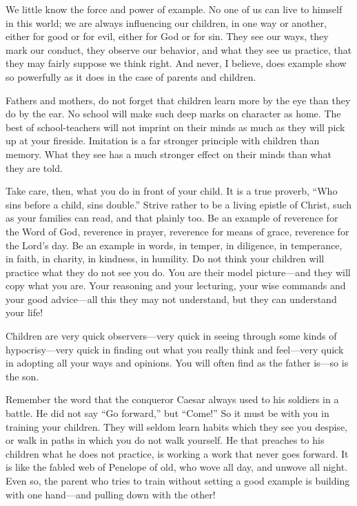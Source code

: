 \documentclass[
]{book}
\begin{document}
We little know the force and power of example. No one of us can live to himself in this world; we are always influencing our children, in one way or another, either for good or for evil, either for God or for sin. They see our ways, they mark our conduct, they observe our behavior, and what they see us practice, that they may fairly suppose we think right. And never, I believe, does example show so powerfully as it does in the case of parents and children.

Fathers and mothers, do not forget that children learn more by the eye than they do by the ear. No school will make such deep marks on character as home. The best of school-teachers will not imprint on their minds as much as they will pick up at your fireside. Imitation is a far stronger principle with children than memory. What they see has a much stronger effect on their minds than what they are told.

Take care, then, what you do in front of your child. It is a true proverb, ``Who sins before a child, sins double.'' Strive rather to be a living epistle of Christ, such as your families can read, and that plainly too. Be an example of reverence for the Word of God, reverence in prayer, reverence for means of grace, reverence for the Lord's day. Be an example in words, in temper, in diligence, in temperance, in faith, in charity, in kindness, in humility. Do not think your children will practice what they do not see you do. You are their model picture---and they will copy what you are. Your reasoning and your lecturing, your wise commands and your good advice---all this they may not understand, but they can understand your life!

Children are very quick observers---very quick in seeing through some kinds of hypocrisy---very quick in finding out what you really think and feel---very quick in adopting all your ways and opinions. You will often find as the father is---so is the son.

Remember the word that the conqueror Caesar always used to his soldiers in a battle. He did not say ``Go forward,'' but ``Come!'' So it must be with you in training your children. They will seldom learn habits which they see you despise, or walk in paths in which you do not walk yourself. He that preaches to his children what he does not practice, is working a work that never goes forward. It is like the fabled web of Penelope of old, who wove all day, and unwove all night. Even so, the parent who tries to train without setting a good example is building with one hand---and pulling down with the other!
\end{document}
